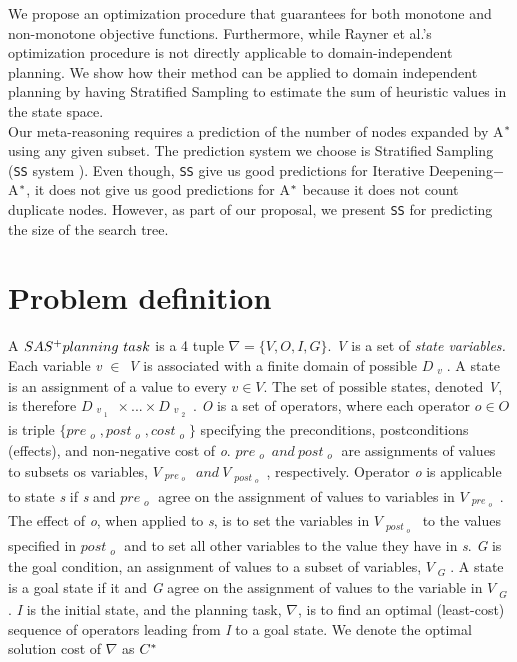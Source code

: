 We propose an optimization procedure that guarantees for both monotone and non-monotone objective functions. Furthermore, while Rayner et al.'s optimization procedure is not directly applicable to domain-independent planning. We show how their method can be applied to domain independent planning by having Stratified Sampling to estimate the sum of heuristic values in the state space.\\

Our meta-reasoning requires a prediction of the number of nodes expanded by A$\sp{*}$ using any given subset. The prediction system we choose is Stratified Sampling (\texttt{SS} system  \cite{lelis2013predicting}). Even though, \texttt{SS} give us good predictions for Iterative Deepening$-$A$\sp{*}$, it does not give us good predictions for A$\sp{*}$ because it does not count duplicate nodes. However, as part of our proposal, we present \texttt{SS} for predicting the size of the search tree.\\

\section{Problem definition}

A $SAS\sp{+} planning\ task$ \cite{backstrom1995complexity} is a 4 tuple $\nabla = \{V, O, I, G\}.$ \textit{V} is a set of \textit{state variables.} Each variable \textit{v} $\in$ \textit{V} is associated with a finite domain of possible $D_{\substack{v}}$. A state is an assignment of a value to every $v \in V.$ The set of possible states, denoted \textit{V}, is therefore $D_{\substack{v_{\substack{1}}}}    \times ... \times D_{\substack{v_{\substack{2}}}}$. \textit{O} is a set of operators, where each operator $o \in O$ is triple $\{pre_{\substack{o}} , post_{\substack{o}}, cost_{\substack{o}}\}$ specifying the preconditions, postconditions (effects), and non-negative cost of \textit{o}. $pre_{\substack{o}}\ and\ post_{\substack{o}}$ are assignments of values to subsets os variables, $V_{\substack{pre_{\substack{o}}}}\ and\ V_{\substack{post_{\substack{o}}}}$, respectively. Operator \textit{o} is applicable to state \textit{s} if \textit{s} and $pre_{\substack{o}}$ agree on the assignment of values to variables in $V_{\substack{pre_{\substack{o}}}}$. The effect of \textit{o}, when applied to \textit{s}, is to set the variables in $V_{\substack{post_{\substack{o}}}}$ to the values specified in $post_{\substack{o}}$ and to set all other variables to the value they have in \textit{s}. \textit{G} is the goal condition, an assignment of values to a subset of variables, $V_{\substack{G}}$. A state is a goal state if it and \textit{G} agree on the assignment of values to the variable in $V_{\substack{G}}$. \textit{I} is the initial state, and the planning task, $\nabla$, is to find an optimal (least-cost) sequence of operators leading from \textit{I} to a goal state. We denote the optimal solution cost of $\nabla$ as $C\sp{*}$ \\

